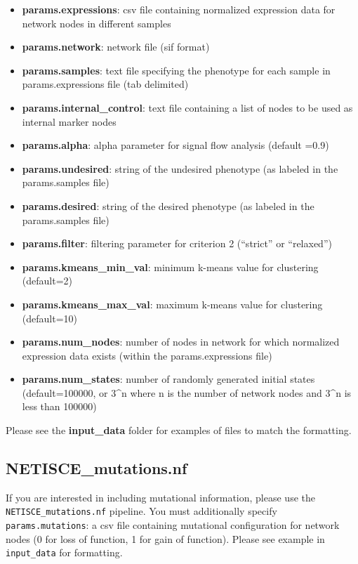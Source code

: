 \documentclass[
]{book}
\providecommand{\tightlist}{%
  \setlength{\itemsep}{0pt}\setlength{\parskip}{0pt}}
\begin{document}
\begin{itemize}
\tightlist
\item
  \textbf{params.expressions}: csv file containing normalized expression data for network nodes in different samples
\item
  \textbf{params.network}: network file (sif format)
\item
  \textbf{params.samples}: text file specifying the phenotype for each sample in params.expressions file (tab delimited)
\item
  \textbf{params.internal\_control}: text file containing a list of nodes to be used as internal marker nodes
\item
  \textbf{params.alpha}: alpha parameter for signal flow analysis (default =0.9)
\item
  \textbf{params.undesired}: string of the undesired phenotype (as labeled in the params.samples file)
\item
  \textbf{params.desired}: string of the desired phenotype (as labeled in the params.samples file)
\item
  \textbf{params.filter}: filtering parameter for criterion 2 (``strict'' or ``relaxed'')
\item
  \textbf{params.kmeans\_min\_val}: minimum k-means value for clustering (default=2)
\item
  \textbf{params.kmeans\_max\_val}: maximum k-means value for clustering (default=10)
\item
  \textbf{params.num\_nodes}: number of nodes in network for which normalized expression data exists (within the params.expressions file)
\item
  \textbf{params.num\_states}: number of randomly generated initial states (default=100000, or 3\^{}n where n is the number of network nodes and 3\^{}n is less than 100000)
\end{itemize}

Please see the \textbf{input\_data} folder for examples of files to match the formatting.

\hypertarget{netisce_mutations.nf}{%
\subsection{NETISCE\_mutations.nf}\label{netisce_mutations.nf}}

If you are interested in including mutational information, please use the \texttt{NETISCE\_mutations.nf} pipeline. You must additionally specify \texttt{params.mutations}: a csv file containing mutational configuration for network nodes (0 for loss of function, 1 for gain of function). Please see example in \texttt{input\_data} for formatting.
\end{document}
